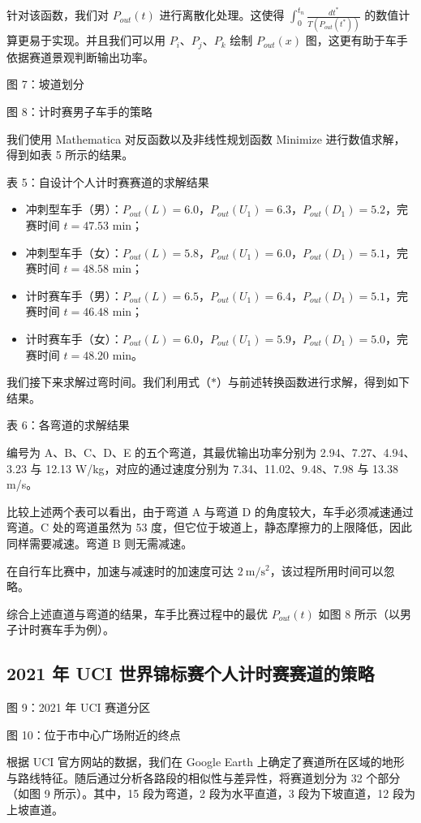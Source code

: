 \documentclass[11pt,a4paper]{ctexart}
\begin{document}
针对该函数，我们对 $P_{out}(t)$ 进行离散化处理。这使得 $\int_0^{t_n}\frac{dt^{\ast}}{T(P_{out}(t^{\ast}))}$ 的数值计算更易于实现。并且我们可以用 $P_i$、$P_j$、$P_k$ 绘制 $P_{out}(x)$ 图，这更有助于车手依据赛道景观判断输出功率。

图 7：坡道划分

图 8：计时赛男子车手的策略

我们使用 Mathematica 对反函数以及非线性规划函数 Minimize 进行数值求解，得到如表 5 所示的结果。

表 5：自设计个人计时赛赛道的求解结果

\begin{itemize}
\item 冲刺型车手（男）：$P_{out}(L)=6.0$，$P_{out}(U_1)=6.3$，$P_{out}(D_1)=5.2$，完赛时间 $t=47.53$ min；
\item 冲刺型车手（女）：$P_{out}(L)=5.8$，$P_{out}(U_1)=6.0$，$P_{out}(D_1)=5.1$，完赛时间 $t=48.58$ min；
\item 计时赛车手（男）：$P_{out}(L)=6.5$，$P_{out}(U_1)=6.4$，$P_{out}(D_1)=5.1$，完赛时间 $t=46.48$ min；
\item 计时赛车手（女）：$P_{out}(L)=6.0$，$P_{out}(U_1)=5.9$，$P_{out}(D_1)=5.0$，完赛时间 $t=48.20$ min。
\end{itemize}

我们接下来求解过弯时间。我们利用式（$\ast$）与前述转换函数进行求解，得到如下结果。

表 6：各弯道的求解结果

编号为 A、B、C、D、E 的五个弯道，其最优输出功率分别为 2.94、7.27、4.94、3.23 与 12.13 W/kg，对应的通过速度分别为 7.34、11.02、9.48、7.98 与 13.38 m/s。

比较上述两个表可以看出，由于弯道 A 与弯道 D 的角度较大，车手必须减速通过弯道。C 处的弯道虽然为 53 度，但它位于坡道上，静态摩擦力的上限降低，因此同样需要减速。弯道 B 则无需减速。

在自行车比赛中，加速与减速时的加速度可达 $2\ \mathrm{m/s^{2}}$，该过程所用时间可以忽略。

综合上述直道与弯道的结果，车手比赛过程中的最优 $P_{out}(t)$ 如图 8 所示（以男子计时赛车手为例）。
\subsection{2021 年 UCI 世界锦标赛个人计时赛赛道的策略}

图 9：2021 年 UCI 赛道分区

图 10：位于市中心广场附近的终点

根据 UCI 官方网站的数据，我们在 Google Earth 上确定了赛道所在区域的地形与路线特征。随后通过分析各路段的相似性与差异性，将赛道划分为 32 个部分（如图 9 所示）。其中，15 段为弯道，2 段为水平直道，3 段为下坡直道，12 段为上坡直道。
\end{document}

